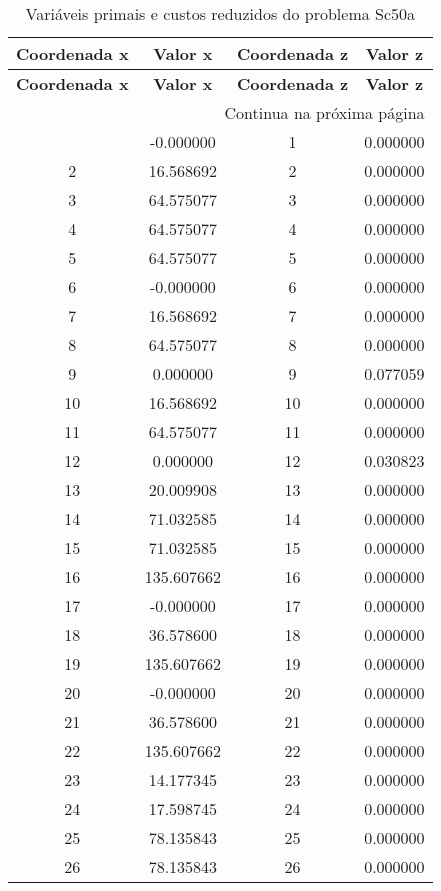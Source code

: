 \documentclass[12pt]{article}
\begin{document}
\begin{longtable}{@{}cccc@{}}
\caption{Variáveis primais e custos reduzidos do problema Sc50a} \\
\toprule
\textbf{Coordenada x} & \textbf{Valor x} & \textbf{Coordenada z} & \textbf{Valor z} \\
\midrule
\endfirsthead

\toprule
\textbf{Coordenada x} & \textbf{Valor x} & \textbf{Coordenada z} & \textbf{Valor z} \\
\midrule
\endhead

\midrule \multicolumn{4}{r}{{Continua na próxima página}} \\ \midrule
\endfoot

\bottomrule
\endlastfoot
1 & -0.000000 & 1 & 0.000000 \\
2 & 16.568692 & 2 & 0.000000 \\
3 & 64.575077 & 3 & 0.000000 \\
4 & 64.575077 & 4 & 0.000000 \\
5 & 64.575077 & 5 & 0.000000 \\
6 & -0.000000 & 6 & 0.000000 \\
7 & 16.568692 & 7 & 0.000000 \\
8 & 64.575077 & 8 & 0.000000 \\
9 & 0.000000 & 9 & 0.077059 \\
10 & 16.568692 & 10 & 0.000000 \\
11 & 64.575077 & 11 & 0.000000 \\
12 & 0.000000 & 12 & 0.030823 \\
13 & 20.009908 & 13 & 0.000000 \\
14 & 71.032585 & 14 & 0.000000 \\
15 & 71.032585 & 15 & 0.000000 \\
16 & 135.607662 & 16 & 0.000000 \\
17 & -0.000000 & 17 & 0.000000 \\
18 & 36.578600 & 18 & 0.000000 \\
19 & 135.607662 & 19 & 0.000000 \\
20 & -0.000000 & 20 & 0.000000 \\
21 & 36.578600 & 21 & 0.000000 \\
22 & 135.607662 & 22 & 0.000000 \\
23 & 14.177345 & 23 & 0.000000 \\
24 & 17.598745 & 24 & 0.000000 \\
25 & 78.135843 & 25 & 0.000000 \\
26 & 78.135843 & 26 & 0.000000 \\

\end{longtable}
\end{document}
